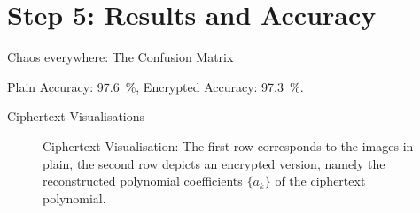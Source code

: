 \section{Step 5: Results and Accuracy}
\begin{frame}{Chaos everywhere: The Confusion Matrix}
  \centering

  \vspace{-0.3cm}
  Plain Accuracy: \SI{97.6}{\percent}, Encrypted Accuracy: \SI{97.3}{\percent}.
\end{frame}

\begin{frame}{Ciphertext Visualisations}
  \begin{figure}[H]
    \centering
    \caption[Visualisation of the plain input images compared to their ciphertext]{Ciphertext Visualisation: The first row corresponds to the images in plain, the second row depicts an encrypted version, namely the reconstructed polynomial coefficients $\{a_k\}$ of the ciphertext polynomial.}
    \label{fig:ciphertext-visualisation}
  \end{figure}
\end{frame}

